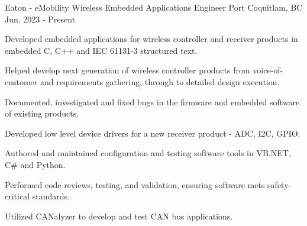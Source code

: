 


\begin{cventries}
    \cventry
    {Eaton - eMobility Wireless} %
    {Embedded Applications Engineer} %
    {Port Coquitlam, BC} %
    {Jun. 2023 - Present} %
    { %
        \begin{cvitems}
            \item {Developed embedded applications for wireless controller and receiver products in embedded C, C++ and IEC 61131-3 structured text.}
            \item {Helped develop next generation of wireless controller products from voice-of-customer and requirements gathering, through to detailed design execution.}
            \item {Documented, investigated and fixed bugs in the firmware and embedded software of existing products.}
            \item {Developed low level device drivers for a new receiver product - ADC, I2C, GPIO.}
            \item {Authored and maintained configuration and testing software tools in VB.NET, C\# and Python.}
            \item {Performed code reviews, testing, and validation, ensuring software mets safety-critical standards.}
            \item {Utilized CANalyzer to develop and test CAN bus applications. }
        \end{cvitems}
        \vspace{4mm}
    }


\end{cventries}
